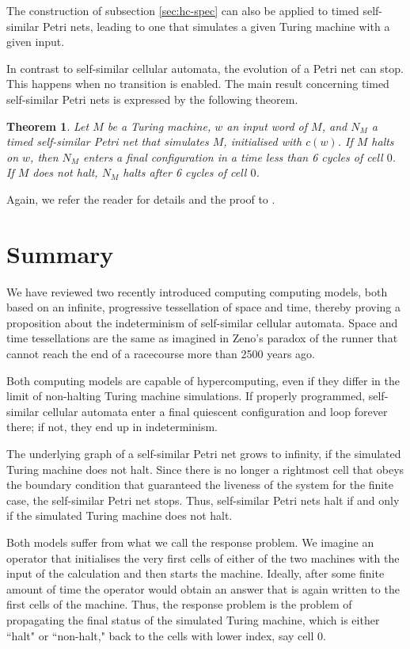 \documentclass{article}
\newtheorem{theorem}{Theorem}
\theoremstyle{definition}
\begin{document}
The construction of subsection \ref{sec:hc-spec} can also be applied to timed self-similar Petri nets,
leading to one that simulates a given Turing machine with a given input.

In contrast to self-similar cellular automata, the evolution of a Petri net can stop.
This happens when no transition is enabled. The main result concerning timed self-similar Petri nets is expressed by
the following theorem.
\begin{theorem}
Let $M$ be a Turing machine, $w$ an input word of $M$, and $N_M$ a timed self-similar Petri net that simulates $M$,
initialised with $c(w)$.
If $M$ halts on $w$, then $N_M$ enters a final configuration in a time less than 6 cycles of cell $0$.
If $M$ does not halt, $N_M$ halts after 6 cycles of cell $0$.
\end{theorem}
Again, we refer the reader for details and the proof to \cite{2008-sica}.

\section{Summary}

We have reviewed two recently introduced computing computing models, both based on an infinite,
progressive tessellation of space and time, thereby proving a proposition about the indeterminism of self-similar cellular automata.
Space and time tessellations are the same as imagined in Zeno's paradox of the runner that cannot reach
the end of a racecourse more than 2500 years ago.

Both computing models are capable of hypercomputing, even if they differ in the limit of non-halting Turing machine simulations.
If properly programmed, self-similar cellular automata enter a final quiescent configuration and loop  forever there; if not,
they end up in indeterminism.

The underlying graph of a self-similar Petri net grows to 
infinity, if the simulated Turing machine does not halt.
Since there is no longer a rightmost cell that obeys the boundary condition that guaranteed the liveness 
of the system for the finite case, the self-similar Petri net stops.
Thus, self-similar Petri nets halt if and only if the simulated Turing machine does not halt.

Both models suffer from what we call the response problem.
We imagine an operator that initialises the very first cells of either of the two machines with the input of the
calculation and then starts the machine.
Ideally, after some finite amount of time the operator would obtain an answer that is again written
to the first cells of the machine.
Thus, the response problem is the problem of propagating the final status of the simulated Turing machine,
 which is either ``halt" or ``non-halt," back to the cells with lower index,
say cell 0.
\end{document}

